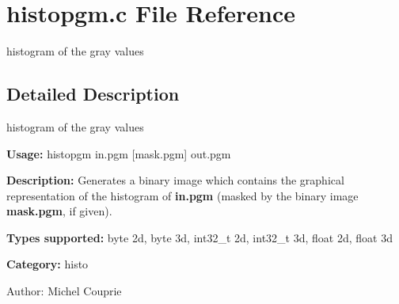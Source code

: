 \section{histopgm.c File Reference}
\label{histopgm_8c}
histogram of the gray values 



\subsection{Detailed Description}
histogram of the gray values 

{\bf Usage:} histopgm in.pgm [mask.pgm] out.pgm

{\bf Description:} Generates a binary image which contains the graphical representation of the histogram of {\bf in.pgm} (masked by the binary image {\bf mask.pgm}, if given).

{\bf Types supported:} byte 2d, byte 3d, int32\_\-t 2d, int32\_\-t 3d, float 2d, float 3d

{\bf Category:} histo

\begin{Desc}
\item[Author:]Michel Couprie \end{Desc}
